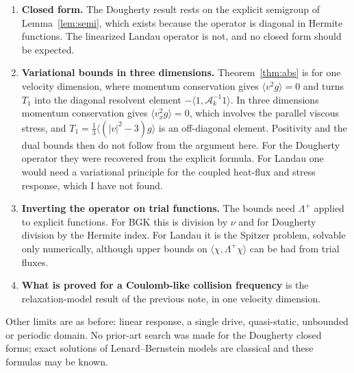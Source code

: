 \documentclass[11pt]{article}
\newcommand{\cA}{\mathcal{A}}
\newcommand{\avg}[1]{\langle #1\rangle}
\theoremstyle{remark}
\begin{document}
\begin{enumerate}
  \item \textbf{Closed form.} The Dougherty result rests on the explicit
    semigroup of Lemma~\ref{lem:semi}, which exists because the operator is
    diagonal in Hermite functions. The linearized Landau operator is not,
    and no closed form should be expected.
  \item \textbf{Variational bounds in three dimensions.}
    Theorem~\ref{thm:abs} is for one velocity dimension, where momentum
    conservation gives $\avg{v^2g}=0$ and turns $T_1$ into the diagonal
    resolvent element $-\avg{1,\cA_k^{-1}1}$. In three dimensions momentum
    conservation gives $\avg{v_x^2g}=0$, which involves the parallel viscous
    stress, and $T_1=\tfrac13\avg{(|v|^2-3)g}$ is an off-diagonal element.
    Positivity and the dual bounds then do not follow from the argument
    here. For the Dougherty operator they were recovered from the explicit
    formula. For Landau one would need a variational principle for the
    coupled heat-flux and stress response, which I have not found.
  \item \textbf{Inverting the operator on trial functions.} The bounds need
    $\Lambda^+$ applied to explicit functions. For BGK this is division by
    $\nu$ and for Dougherty division by the Hermite index. For Landau it is
    the Spitzer problem, solvable only numerically, although upper bounds on
    $\avg{\chi,\Lambda^+\chi}$ can be had from trial fluxes.
  \item \textbf{What is proved for a Coulomb-like collision frequency} is
    the relaxation-model result of the previous note, in one velocity
    dimension.
\end{enumerate}
Other limits are as before: linear response, a single drive, quasi-static,
unbounded or periodic domain. No prior-art search was made for the Dougherty
closed forms; exact solutions of Lenard--Bernstein models are classical and
these formulas may be known.
\end{document}
